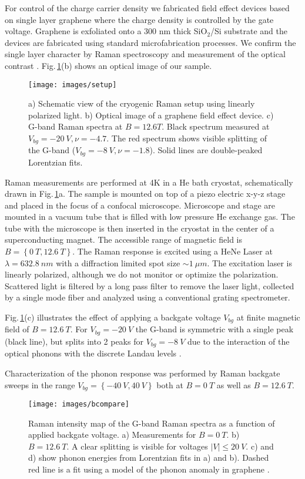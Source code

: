 \documentclass[prl,aps,superscriptaddress,showpacs,reprint]{revtex4-1}
\begin{document}
For control of the charge carrier density we fabricated field effect devices based on single layer graphene where the charge density is controlled by the gate voltage. Graphene is exfoliated onto a 300 nm thick SiO$_2$/Si substrate and the devices are fabricated using standard microfabrication processes. We confirm the single layer character by Raman spectroscopy and measurement of the optical contrast \cite{ferrari2006raman,casiraghi2007rayleigh,ni2007graphene,blake2007making}.
Fig.\,\ref{setup}(b) shows an optical image of our sample.

\begin{figure}
\texttt{[image: images/setup]}
\caption{\label{setup}a) Schematic view of the cryogenic Raman setup using linearly polarized light. b) Optical image of a graphene field effect device. c) G-band Raman spectra at $B=12.6T$. Black spectrum measured at $V_{bg}=-20\: V, \nu=-4.7$. The red spectrum shows visible splitting of the G-band ($V_{bg}=-8\: V,\nu=-1.8$). Solid lines are double-peaked Lorentzian fits.}
\end{figure}

Raman measurements are performed at 4K in a He bath cryostat, schematically drawn in Fig.\,\ref{setup}a. The sample is mounted on top of a piezo electric x-y-z stage and placed in the focus of a confocal microscope. Microscope and stage are mounted in a vacuum tube that is filled with low pressure He exchange gas. The tube with the microscope is then inserted in the cryostat in the center of a superconducting magnet. The accessible range of magnetic field is $B=\left\lbrace 0\: T,12.6\: T \right\rbrace$.
The Raman response is excited using a HeNe Laser at $\lambda=632.8\: nm$ with a diffraction limited spot size $\sim 1\: \mu m$. The excitation laser is linearly polarized, although we do not monitor or optimize the polarization. Scattered light is filtered by a long pass filter to remove the laser light, collected by a single mode fiber and analyzed using a conventional grating spectrometer.

Fig.\,\ref{setup}(c) illustrates the effect of applying a backgate voltage $V_{bg}$ at finite magnetic field of $B=12.6\: T$. For $V_{bg}=-20\: V$ the G-band is symmetric with a single peak (black line), but splits into 2 peaks for $V_{bg}=-8\: V$ due to the interaction of the optical phonons with the discrete Landau levels \cite{kias2009} .

Characterization of the phonon response was performed by Raman backgate sweeps in the range $V_{bg}=\left\lbrace -40\: V,40\: V \right\rbrace$ both at $B=0\: T$ as well as $B=12.6\: T$.
\begin{figure}[!hb]
\texttt{[image: images/bcompare]}
\caption{\label{bcompare}
Raman intensity map of the G-band Raman spectra as a function of applied backgate voltage. a) Measurements for $B=0\: T$. b) $B=12.6\: T$. A clear splitting is visible for voltages $\left|V\right|\leq 20\: V$. c) and d)  show phonon energies from Lorentzian fits in a) and b). Dashed red line is a fit using a model of the phonon anomaly in graphene \cite{tsuneya2006anomaly}.}
\end{figure}
\end{document}
